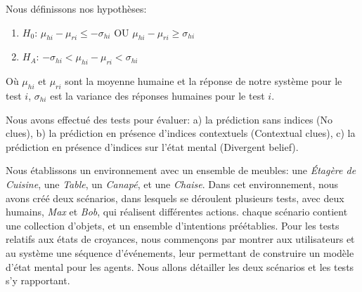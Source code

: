 \documentclass[a4paper,11pt,twoside]{StyleThese}
\begin{document}
Nous définissons nos hypothèses:

\begin{enumerate}
\item $H_0$: $\mu_{hi}-\mu_{ri}\leq-\sigma_{hi}$ OU $\mu_{hi}-\mu_{ri}\geq\sigma_{hi}$
\item $H_A$: $-\sigma_{hi}<\mu_{hi}-\mu_{ri}<\sigma_{hi}$
\end{enumerate}

Où $\mu_{hi}$ et $\mu_{ri}$ sont la moyenne humaine et la réponse de notre système pour le test $i$, $\sigma_{hi}$ est la variance des réponses humaines pour le test $i$.

Nous avons effectué des tests pour évaluer: a) la prédiction sans indices (No clues), b) la prédiction en présence d'indices contextuels (Contextual clues), c) la prédiction en présence d'indices sur l'état mental (Divergent belief).

Nous établissons un environnement avec un ensemble de meubles: une \textit{Étagère de Cuisine}, une \textit{Table}, un \textit{Canapé}, et une \textit{Chaise}. Dans cet environnement, nous avons créé deux scénarios, dans lesquels se déroulent plusieurs tests, avec deux humains, \textit{Max} et \textit{Bob}, qui réalisent différentes actions. chaque scénario contient une collection d'objets, et un ensemble d'intentions préétablies. Pour les tests relatifs aux états de croyances, nous commençons par montrer aux utilisateurs et au système une séquence d'événements, leur permettant de construire un modèle d'état mental pour les agents. Nous allons détailler les deux scénarios et les tests s'y rapportant.
\end{document}
